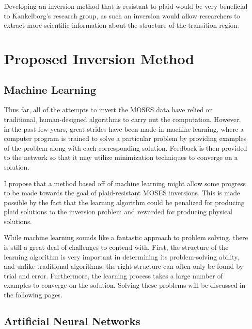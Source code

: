 \documentclass[twoside]{article}
\begin{document}
\begin{multicols}{2}
Developing an inversion method that is resistant to plaid would be very beneficial to Kankelborg's research group, as such an inversion would allow researchers to extract more scientific information about the structure of the transition region.

\section{Proposed Inversion Method}
\subsection{Machine Learning}
Thus far, all of the attempts to invert the MOSES data have relied on traditional, human-designed algorithms to carry out the computation. However, in the past few years, great strides have been made in machine learning, where a computer program is trained to solve a particular problem by providing examples of the problem along with each corresponding solution. Feedback is then provided to the network so that it may utilize minimization techniques to converge on a solution. \par I propose that a method based off of machine learning might allow some progress to be made towards the goal of plaid-resistant MOSES inversions. This is made possible by the fact that the learning algorithm could be penalized for producing plaid solutions to the inversion problem and rewarded for producing physical solutions.  \par While machine learning sounds like a fantastic approach to problem solving, there is still a great deal of challenges to contend with. First, the structure of the learning algorithm is very important in determining its problem-solving ability, and unlike traditional algorithms, the right structure can often only be found by trial and error. Furthermore, the learning process takes a large number of examples to converge on the solution. Solving these problems will be discussed in the following pages.

\subsection{Artificial Neural Networks}


\end{multicols}
\end{document}
